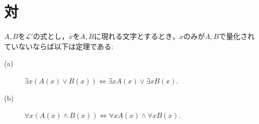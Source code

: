 \section{対}
	\begin{screen}
		\begin{logicalthm}[量化記号の性質(ロ)]\label{logicalthm:properties_of_quantifiers_2}
			$A,B$を$\mathcal{L}'$の式とし，$x$を$A,B$に現れる文字とするとき，$x$のみが$A,B$で量化されていないならば以下は定理である:
			\begin{description}
				\item[(a)] $\exists x ( A(x) \vee B(x) ) \Longleftrightarrow \exists x A(x) \vee \exists x B(x)$.
				
				\item[(b)] $\forall x ( A(x) \wedge B(x) ) \Longleftrightarrow \forall x A(x) \wedge \forall x B(x)$.
			\end{description}
		\end{logicalthm}
	\end{screen}
	
